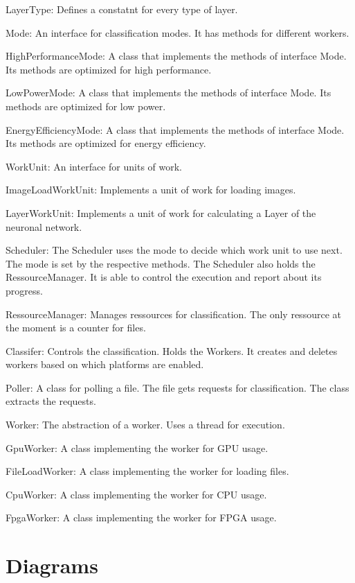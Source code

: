 \documentclass[parskip=full]{scrartcl}
\begin{document}
LayerType: Defines a constatnt for every type of layer.

Mode: An interface for classification modes. It has methods for different workers.

HighPerformanceMode: A class that implements the methods of interface Mode. Its methods are optimized for high performance.

LowPowerMode: A class that implements the methods of interface Mode. Its methods are optimized for low power.

EnergyEfficiencyMode: A class that implements the methods of interface Mode. Its methods are optimized for energy efficiency.

WorkUnit: An interface for units of work.

ImageLoadWorkUnit: Implements a unit of work for loading images.

LayerWorkUnit: Implements a unit of work for calculating a Layer of the neuronal network.

Scheduler: The Scheduler uses the mode to decide which work unit to use next. The mode is set by the respective methods. The Scheduler also holds the RessourceManager. It is able to control the execution and report about its progress.

RessourceManager: Manages ressources for classification. The only ressource at the moment is a counter for files.

Classifer: Controls the classification. Holds the Workers. It creates and deletes workers based on which platforms are enabled.

Poller: A class for polling a file. The file gets requests for classification. The class extracts the requests.

Worker: The abstraction of a worker. Uses a thread for execution.

GpuWorker: A class implementing the worker for GPU usage.

FileLoadWorker: A class implementing the worker for loading files.

CpuWorker: A class implementing the worker for CPU usage.

FpgaWorker: A class implementing the worker for FPGA usage.



\pagebreak

\section {Diagrams}
\end{document}

